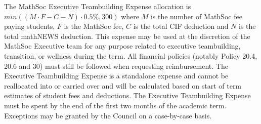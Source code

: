 The MathSoc Executive Teambuilding Expense allocation is $min((M\cdot F - C - N)\cdot 0.5\%, 300)$ where $M$ is the number of MathSoc fee paying students, $F$ is the MathSoc fee, $C$ is the total CIF deduction and $N$ is the total mathNEWS deduction. This expense may be used at the discretion of the MathSoc Executive team for any purpose related to executive teambuilding, transition, or wellness during the term. All financial policies (notably Policy 20.4, 20.6 and 30) must still be followed when requesting reimbursement. The Executive Teambuilding Expense is a standalone expense and cannot be reallocated into or carried over and will be calculated based on start of term estimates of student fees and deductions. The Executive Teambuilding Expense must be spent by the end of the first two months of the academic term. Exceptions may be granted by the Council on a case-by-case basis.
